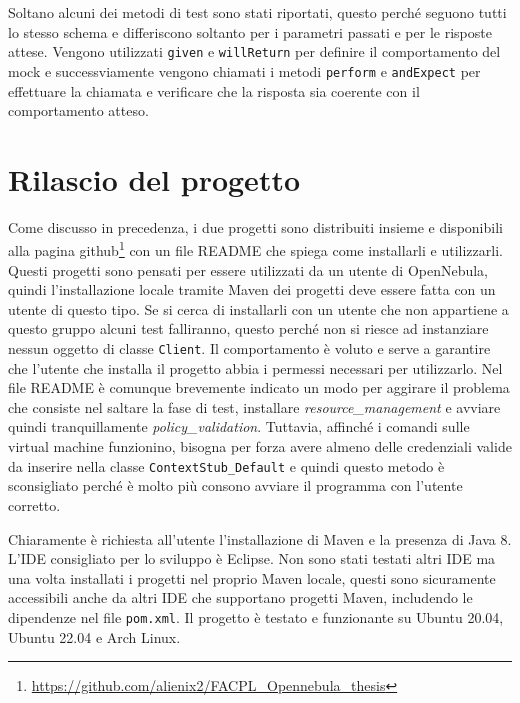Soltano alcuni dei metodi di test sono stati riportati, questo perché seguono tutti lo stesso schema e differiscono soltanto per i parametri passati e per le risposte attese. Vengono utilizzati \texttt{given} e \texttt{willReturn} per definire il comportamento del mock e successviamente vengono chiamati i metodi \texttt{perform} e \texttt{andExpect} per effettuare la chiamata e verificare che la risposta sia coerente con il comportamento atteso.

\section{Rilascio del progetto}
Come discusso in precedenza, i due progetti sono distribuiti insieme e disponibili alla pagina github\footnote{\url{https://github.com/alienix2/FACPL_Opennebula_thesis}} con un file README che spiega come installarli e utilizzarli. Questi progetti sono pensati per essere utilizzati da un utente di OpenNebula, quindi l'installazione locale tramite Maven dei progetti deve essere fatta con un utente di questo tipo. Se si cerca di installarli con un utente che non appartiene a questo gruppo alcuni test falliranno, questo perché non si riesce ad instanziare nessun oggetto di classe \texttt{Client}. Il comportamento è voluto e serve a garantire che l'utente che installa il progetto abbia i permessi necessari per utilizzarlo. Nel file README è comunque brevemente indicato un modo per aggirare il problema che consiste nel saltare la fase di test, installare \emph{resource\_management} e avviare quindi tranquillamente \emph{policy\_validation}. Tuttavia, affinché i comandi sulle virtual machine funzionino, bisogna per forza avere almeno delle credenziali valide da inserire nella classe \texttt{ContextStub\_Default} e quindi questo metodo è sconsigliato perché è molto più consono avviare il programma con l'utente corretto.\par
Chiaramente è richiesta all'utente l'installazione di Maven e la presenza di Java 8. L'IDE consigliato per lo sviluppo è Eclipse. Non sono stati testati altri IDE ma una volta installati i progetti nel proprio Maven locale, questi sono sicuramente accessibili anche da altri IDE che supportano progetti Maven, includendo le dipendenze nel file \texttt{pom.xml}. Il progetto è testato e funzionante su Ubuntu 20.04, Ubuntu 22.04 e Arch Linux.